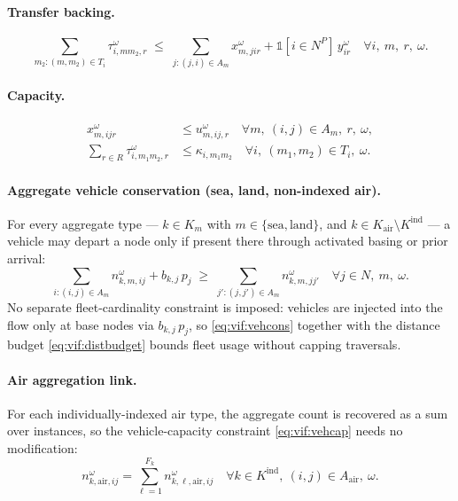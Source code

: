 \paragraph{Transfer backing.}
\begin{equation}
\sum_{m_2:(m,m_2)\in T_i} \tau^\omega_{i,mm_2,r}
\;\leq\;
\sum_{j:(j,i)\in A_m} x^\omega_{m,jir}
  + \mathbb{1}[i \in N^P]\, y^\omega_{ir}
\quad \forall i,\ m,\ r,\ \omega.
\label{eq:vif:transferbacking}
\end{equation}

\paragraph{Capacity.}
\begin{align}
x^\omega_{m,ijr} &\leq u^\omega_{m,ij,r}
  \quad \forall m,\ (i,j) \in A_m,\ r,\ \omega, \label{eq:vif:arccap} \\
\sum_{r \in R} \tau^\omega_{i,m_1m_2,r} &\leq \kappa_{i,m_1m_2}
  \quad \forall i,\ (m_1,m_2) \in T_i,\ \omega. \label{eq:vif:transfercap}
\end{align}

\paragraph{Aggregate vehicle conservation (sea, land, non-indexed air).}
For every aggregate type --- $k \in K_m$ with $m \in \{\text{sea},\text{land}\}$,
and $k \in K_{\mathrm{air}} \setminus K^{\mathrm{ind}}$ --- a vehicle may depart
a node only if present there through activated basing or prior arrival:
\begin{equation}
\sum_{i:(i,j)\in A_m} n^\omega_{k,m,ij} + b_{k,j}\, p_j
\;\geq\;
\sum_{j':(j,j')\in A_m} n^\omega_{k,m,jj'}
\quad \forall j \in N,\ m,\ \omega.
\label{eq:vif:vehcons}
\end{equation}
No separate fleet-cardinality constraint is imposed: vehicles are injected
into the flow only at base nodes via $b_{k,j}\,p_j$, so
\eqref{eq:vif:vehcons} together with the distance budget
\eqref{eq:vif:distbudget} bounds fleet usage without capping traversals.

\paragraph{Air aggregation link.}
For each individually-indexed air type, the aggregate count is recovered as a
sum over instances, so the vehicle-capacity constraint
\eqref{eq:vif:vehcap} needs no modification:
\begin{equation}
n^\omega_{k,\text{air},ij} = \sum_{\ell=1}^{F_k} n^\omega_{k,\ell,\text{air},ij}
\quad \forall k \in K^{\mathrm{ind}},\ (i,j) \in A_{\text{air}},\ \omega.
\label{eq:vif:agglink}
\end{equation}

